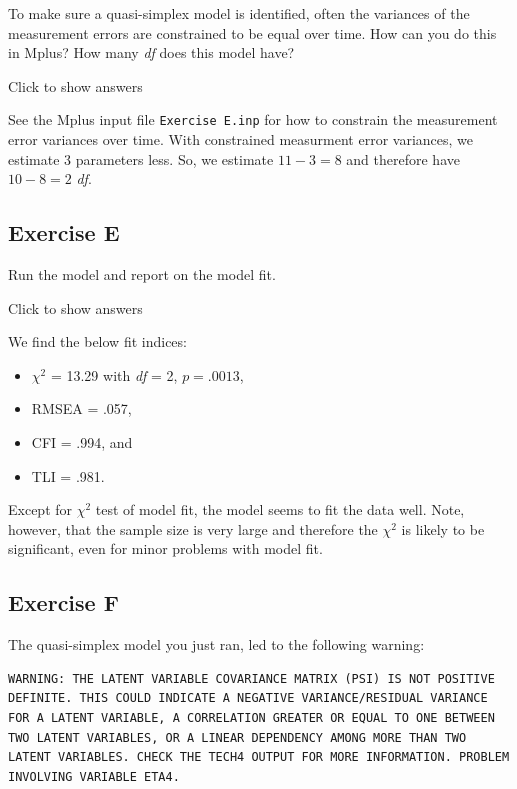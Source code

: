 \documentclass[
]{book}
\providecommand{\tightlist}{%
  \setlength{\itemsep}{0pt}\setlength{\parskip}{0pt}}
\begin{document}
To make sure a quasi-simplex model is identified, often the variances of the measurement errors are constrained to be equal over time. How can you do this in Mplus? How many \emph{df} does this model have?

Click to show answers

See the Mplus input file \texttt{Exercise\ E.inp} for how to constrain the measurement error variances over time. With constrained measurment error variances, we estimate 3 parameters less. So, we estimate \(11 - 3 = 8\) and therefore have \(10 - 8 = 2\) \emph{df}.

\hypertarget{exercise-e}{%
\subsection{Exercise E}\label{exercise-e}}

Run the model and report on the model fit.

Click to show answers

We find the below fit indices:

\begin{itemize}
\tightlist
\item
  \(\chi^{2}\) = 13.29 with \emph{df} = 2, \(p = .0013\),
\item
  RMSEA = .057,
\item
  CFI = .994, and
\item
  TLI = .981.
\end{itemize}

Except for \(\chi^{2}\) test of model fit, the model seems to fit the data well. Note, however, that the sample size is very large and therefore the \(\chi^{2}\) is likely to be significant, even for minor problems with model fit.

\hypertarget{exercise-f}{%
\subsection{Exercise F}\label{exercise-f}}

The quasi-simplex model you just ran, led to the following warning:

\begin{verbatim}
WARNING: THE LATENT VARIABLE COVARIANCE MATRIX (PSI) IS NOT POSITIVE DEFINITE. THIS COULD INDICATE A NEGATIVE VARIANCE/RESIDUAL VARIANCE FOR A LATENT VARIABLE, A CORRELATION GREATER OR EQUAL TO ONE BETWEEN TWO LATENT VARIABLES, OR A LINEAR DEPENDENCY AMONG MORE THAN TWO LATENT VARIABLES. CHECK THE TECH4 OUTPUT FOR MORE INFORMATION. PROBLEM INVOLVING VARIABLE ETA4.
\end{verbatim}
\end{document}
